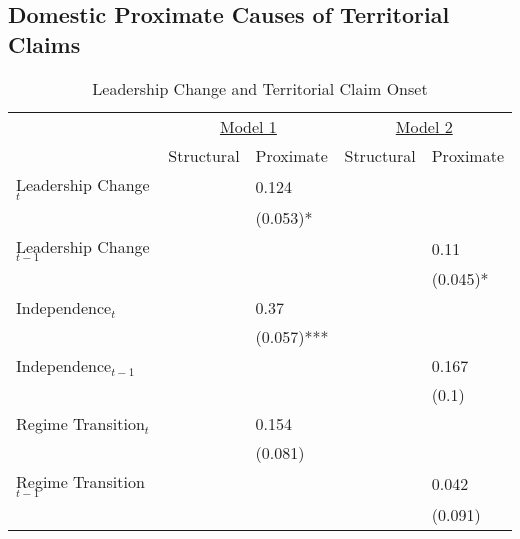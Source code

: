 \subsection{Domestic Proximate Causes of Territorial Claims}

\begin{table}[htpb]
	\caption{Leadership Change and Territorial Claim Onset \label{tab_l}}
	\centering
	\begin{tabular}{lllll}
		\hline
		& \multicolumn{2}{c}{\underline{Model 1}} & \multicolumn{2}{c}{\underline{Model 2}} \\
		& Structural & Proximate                  & Structural & Proximate                  \\ \hline
		Leadership Change$_{t}$     &            & 0.124                      &            &                            \\
		&            & (0.053)*                   &            &                            \\
		Leadership Change$_{t-1}$   &            &                            &            & 0.11                       \\
		&            &                            &            & (0.045)*                   \\
		Independence$_t$            &            & 0.37                       &            &                            \\
		&            & (0.057)***                 &            &                            \\
		Independence$_{t-1}$        &            &                            &            & 0.167                      \\
		&            &                            &            & (0.1)                     \\
		Regime Transition$_t$       &            & 0.154                      &            &                            \\
		&            & (0.081)                   &            &                            \\
		Regime Transition$_{t-1}$   &            &                            &            & 0.042                      \\
		&            &                            &            & (0.091)                    \\

\end{tabular}
\end{table}
